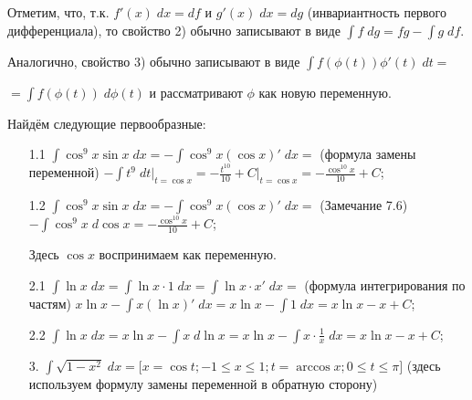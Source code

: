     \begin{mention}
    	Отметим, что, т.к. $f'(x) \; dx = df$ и $g'(x) \; dx = dg$ (инвариантность первого дифференциала), то свойство 2) обычно записывают в виде $\displaystyle\int f \; dg = fg - \displaystyle\int g \; df$.
    	
    	Аналогично, свойство 3) обычно записывают в виде $\displaystyle\int f(\phi(t))\phi'(t) \; dt =$    	
    	
    	$= \displaystyle\int f(\phi(t)) \; d\phi(t)$ и рассматривают $\phi$ как новую переменную.
    \end{mention}
    
    \begin{example} Найдём следующие первообразные:
    
    \begin{enumerate}
    	\item[1.1] $\displaystyle\int \cos^9{x} \sin{x} \; dx = -\displaystyle\int \cos^9{x} (\cos{x})' \; dx =$ (формула замены переменной) $-\displaystyle\int t^9 \; dt\bigg|_{t=\cos{x}} = -\frac{t^{10}}{10} + C\bigg|_{t=\cos{x}} = -\frac{\cos^{10}{x}}{10} + C$;
    		
    	\item[1.2] $\displaystyle\int \cos^9{x} \sin{x} \; dx = -\displaystyle\int \cos^9{x} (\cos{x})' \; dx =$ (Замечание 7.6) $ -\displaystyle\int \cos^9{x} \;  d\cos{x} = -\frac{\cos^{10}{x}}{10} + C$;
    		
    	Здесь $\cos{x}$ воспринимаем как переменную.
    	
    	\item[2.1] $\displaystyle\int \ln{x} \; dx = \displaystyle\int \ln{x} \cdot 1 \; dx = \displaystyle\int \ln{x} \cdot x' \; dx =$ (формула интегрирования по частям) $x\ln{x} - \displaystyle\int x(\ln{x})' \; dx = x\ln{x} - \displaystyle\int 1 \; dx = x\ln{x} - x + C$;
    		
    	\item[2.2] $\displaystyle\int \ln{x} \; dx = x\ln{x} - \displaystyle\int x \; d\ln{x} = x\ln{x} - \displaystyle\int x \cdot \frac{1}{x} \; dx = x\ln{x} - x + C$;
    	
    	\item[3.] $\displaystyle\int \sqrt{1 - x^2} \; dx = \bigg[x = \cos{t}; -1 \leqslant x \leqslant 1; t = \arccos{x}; 0 \leqslant t \leqslant \pi \bigg]$ (здесь используем формулу замены переменной в обратную сторону) 
    	

\end{enumerate}
\end{example}
